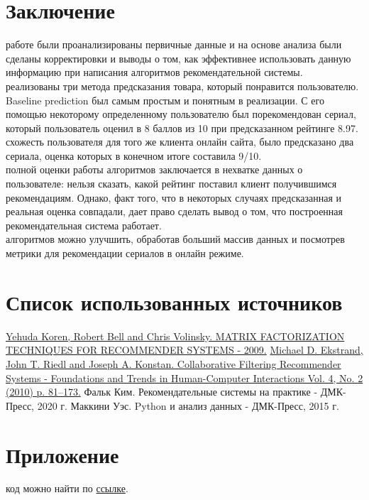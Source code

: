\documentclass{article}
\newcommand\tab[1][1cm]{\hspace*{#1}}
\begin{document}
\section*{Заключение}
 работе были проанализированы первичные данные и на основе анализа были сделаны корректировки и выводы о том, как эффективнее использовать данную информацию при написания алгоритмов рекомендательной системы. \\
 реализованы три метода предсказания товара, который понравится пользователю. Baseline prediction был самым простым и понятным в реализации. С его помощью некоторому определенному пользователю был порекомендован сериал, который пользователь оценил в 8 баллов из 10 при предсказанном рейтинге 8.97.\\
 схожесть пользователя для того же клиента онлайн сайта, было предсказано два сериала, оценка которых в конечном итоге составила 9/10.\\
 полной оценки работы алгоритмов заключается в нехватке данных о пользователе: нельзя сказать, какой рейтинг поставил клиент получившимся рекомендациям. Однако, факт того, что в некоторых случаях предсказанная и реальная оценка совпадали, дает право сделать вывод о том, что построенная рекомендательная система работает.\\
 алгоритмов можно улучшить, обработав больший массив данных и посмотрев метрики для рекомендации сериалов в онлайн режиме.
\newpage
{}
\section*{Список использованных источников}
\renewcommand{\refname}{}
\begin{thebibliography}{7}
 \href{https://datajobs.com/data-science-repo/Recommender-Systems-[Netflix].pdf}{Yehuda Koren, Robert Bell and Chris Volinsky. MATRIX FACTORIZATION TECHNIQUES FOR RECOMMENDER SYSTEMS - 2009.}
 \href{http://files.grouplens.org/papers/FnT\%20CF\%20Recsys\%20Survey.pdf}{Michael D. Ekstrand, John T. Riedl and Joseph A. Konstan. Collaborative Filtering Recommender Systems - Foundations and Trends in Human-Computer Interactions Vol. 4, No. 2 (2010) p. 81–173.}
 Фальк Ким. Рекомендательные системы на практике - ДМК-Пресс, 2020 г. 
 Маккини Уэс. Python и анализ данных - ДМК-Пресс, 2015 г. 
\end{thebibliography}
\newpage
{}
\section*{Приложение}
 код можно найти по \href{https://github.com/dokapoka/paper_recomm_systems}{ссылке}.

 
\end{document}
